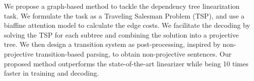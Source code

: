 We propose a graph-based method to tackle the dependency tree linearization task. We formulate the task as a Traveling Salesman Problem (TSP), and use a biaffine attention model to calculate the edge costs. We facilitate the decoding by solving the TSP for each subtree and combining the solution into a projective tree. We then design a transition system as post-processing, inspired by non-projective transition-based parsing, to obtain non-projective sentences. Our proposed method outperforms the state-of-the-art linearizer while being 10 times faster in training and decoding.
